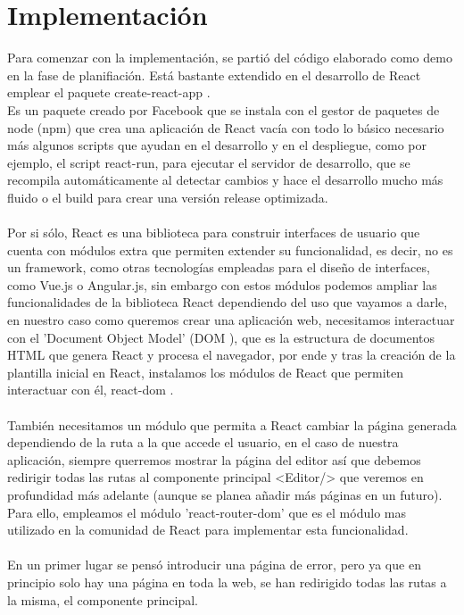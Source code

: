 \chapter{Implementación}
Para comenzar con la implementación, se partió del código elaborado como demo en la fase 
de planifiación.
Está bastante extendido en el desarrollo de React emplear el paquete create-react-app 
\cite{create-react-app}.
\\
Es un paquete creado por Facebook que se instala con el gestor de paquetes de node 
(npm) que crea una aplicación de React vacía con todo lo básico necesario más 
algunos scripts que ayudan en el desarrollo y en el despliegue, como por ejemplo, el 
script react-run, para ejecutar el servidor de desarrollo, que se recompila
automáticamente al detectar cambios y hace el desarrollo mucho más fluido o el build
para crear una versión release optimizada.
\\\\
Por si sólo, React es una biblioteca para construir interfaces de usuario que cuenta con
módulos extra que permiten extender su funcionalidad, es decir, no es un framework, como
otras tecnologías empleadas para el diseño de interfaces, como Vue.js o Angular.js, 
sin embargo con estos módulos podemos ampliar las funcionalidades de la biblioteca React 
dependiendo del uso que vayamos a darle, en nuestro caso como queremos crear una aplicación
web, necesitamos interactuar con el 'Document Object Model' (DOM \cite{DOM}), que es la estructura
de documentos HTML que genera React y procesa el navegador, por ende y tras la creación de 
la plantilla inicial en React, instalamos los módulos de React que permiten interactuar 
con él, react-dom \cite{react-dom}.
\\\\
También necesitamos un módulo que permita a React cambiar la página generada dependiendo de la 
ruta a la que accede el usuario, en el caso de nuestra aplicación, siempre querremos mostrar 
la página del editor así que debemos redirigir todas las rutas al componente principal <Editor/>
que veremos en profundidad más adelante (aunque se planea añadir más páginas en un futuro).
Para ello, empleamos el módulo 'react-router-dom' \cite{react-router-dom} que es el módulo
mas utilizado en la comunidad de React para implementar esta funcionalidad.
\\\\
En un primer lugar se pensó introducir una página de error, pero ya que en principio solo hay una
página en toda la web, se han redirigido todas las rutas a la misma, el componente principal.

